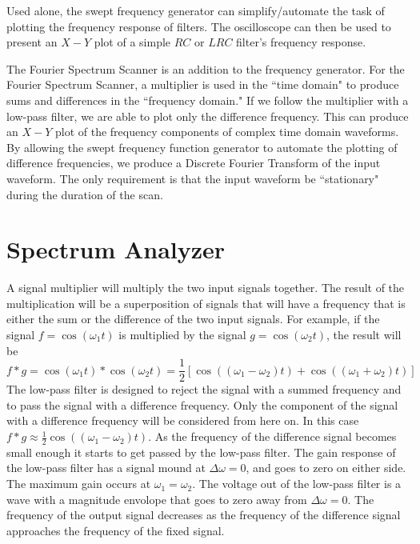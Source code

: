 \documentclass[12pt, a4paper, oneside, openright, titlepage]{book}
\begin{document}
Used alone, the swept frequency generator can simplify/automate the task of plotting the frequency response of filters. The oscilloscope can then be used to present an $X-Y$ plot of a simple $RC$ or $LRC$ filter's frequency response.

The Fourier Spectrum Scanner is an addition to the frequency generator. For the Fourier Spectrum Scanner, a multiplier is used in the ``time domain" to produce sums and differences in the ``frequency domain." If we follow the multiplier with a low-pass filter, we are able to plot only the difference frequency. This can produce an $X-Y$ plot of the frequency components of complex time domain waveforms. By allowing the swept frequency function generator to automate the plotting of difference frequencies, we produce a Discrete Fourier Transform of the input waveform. The only requirement is that the input waveform be ``stationary" during the duration of the scan.

\section{Spectrum Analyzer}

A signal multiplier will multiply the two input signals together. The result of the multiplication will be a superposition of signals that will have a frequency that is either the sum or the difference of the two input signals. For example, if the signal $f = \cos(\omega_1t)$ is multiplied by the signal $g = \cos(\omega_2t)$, the result will be \begin{equation*}
    f*g = \cos(\omega_1t)*\cos(\omega_2t) = \frac{1}{2}\left[\cos((\omega_1-\omega_2)t)+\cos((\omega_1+\omega_2)t)\right]
\end{equation*}
The low-pass filter is designed to reject the signal with a summed frequency and to pass the signal with a difference frequency. Only the component of the signal with a difference frequency will be considered from here on. In this case $f*g\approx \frac{1}{2}\cos((\omega_1-\omega_2)t)$. As the frequency of the difference signal becomes small enough it starts to get passed by the low-pass filter. The gain response of the low-pass filter has a signal mound at $\Delta\omega = 0$, and goes to zero on either side. The maximum gain occurs at $\omega_1 = \omega_2$. The voltage out of the low-pass filter is a wave with a magnitude envolope that goes to zero away from $\Delta\omega = 0$. The frequency of the output signal decreases as the frequency of the difference signal approaches the frequency of the fixed signal.
\end{document}
